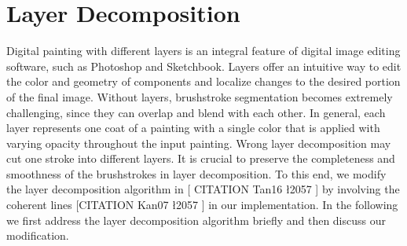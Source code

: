 
\section{Layer Decomposition}
Digital painting with different layers is an integral feature of digital image editing software, such as Photoshop and Sketchbook. Layers offer an intuitive way to edit the color and geometry of components and localize changes to the desired portion of the final image. Without layers, brushstroke segmentation becomes extremely challenging, since they can overlap and blend with each other.
In general, each layer represents one coat of a painting with a single color that is applied with varying opacity throughout the input painting. Wrong layer decomposition may cut one stroke into different layers. It is crucial to preserve the completeness and smoothness of the brushstrokes in layer decomposition. To this end, we modify the layer decomposition algorithm in [ CITATION Tan16 \l 2057 ] by involving the coherent lines [CITATION Kan07 \l 2057 ] in our implementation. In the following we first address the layer decomposition algorithm briefly and then discuss our modification.
